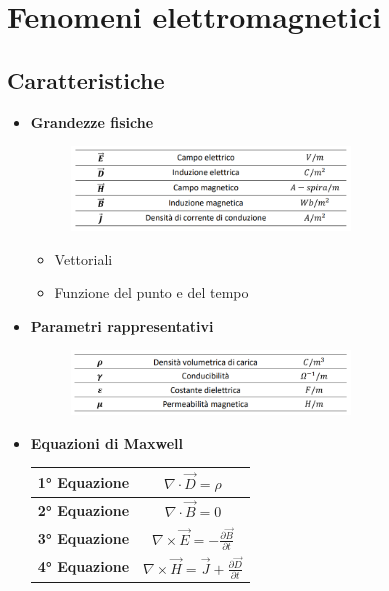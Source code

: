 \chapter{Fenomeni elettromagnetici}

\section*{Caratteristiche}
\begin{itemize}
    \item \textbf{Grandezze fisiche}
    \begin{figure}[h!]
        \centering
        \includegraphics[width=0.7\textwidth]{capitoli/capitolo3/immagini/image1.png}
    \end{figure}
    \begin{itemize}
        \item Vettoriali
        \item Funzione del punto e del tempo
    \end{itemize}

    \item \textbf{Parametri rappresentativi}
    \begin{figure}[h!]
        \centering
        \includegraphics[width=0.7\textwidth]{capitoli/capitolo3/immagini/image2.png}
    \end{figure}

    \vspace{9cm}

    \item \textbf{Equazioni di Maxwell}
    \begin{table}[h]
        \centering
        \renewcommand{\arraystretch}{1.5}
        \begin{tabular}{|l c|}
            \hline
            \textbf{1° Equazione} & \( \nabla \cdot \vec{D} = \rho \) \\
            \hline
            \textbf{2° Equazione} & \( \nabla \cdot \vec{B} = 0 \) \\
            \hline
            \textbf{3° Equazione} & \( \nabla \times \vec{E} = -\frac{\partial \vec{B}}{\partial t} \) \\
            \hline
            \textbf{4° Equazione} & \( \nabla \times \vec{H} = \vec{J} + \frac{\partial \vec{D}}{\partial t} \) \\
            \hline
        \end{tabular}
    \end{table}


\end{itemize}
